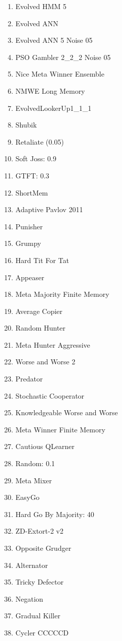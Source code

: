 \begin{multicols}{3}
\begin{enumerate}
  \item Evolved HMM 5
  \item Evolved ANN
  \item Evolved ANN 5 Noise 05
  \item PSO Gambler 2\_2\_2 Noise 05
  \item Nice Meta Winner Ensemble
  \item NMWE Long Memory
  \item EvolvedLookerUp1\_1\_1
  \item Shubik
  \item Retaliate (0.05)
  \item Soft Joss: 0.9
  \item GTFT: 0.3
  \item ShortMem
  \item Adaptive Pavlov 2011
  \item Punisher
  \item Grumpy
  \item Hard Tit For Tat
  \item Appeaser
  \item Meta Majority Finite Memory
  \item Average Copier
  \item Random Hunter
  \item Meta Hunter Aggressive
  \item Worse and Worse 2
  \item Predator
  \item Stochastic Cooperator
  \item Knowledgeable Worse and Worse
  \item Meta Winner Finite Memory
  \item Cautious QLearner
  \item Random: 0.1
  \item Meta Mixer
  \item EasyGo
  \item Hard Go By Majority: 40
  \item ZD-Extort-2 v2
  \item Opposite Grudger
  \item Alternator
  \item Tricky Defector
  \item Negation
  \item Gradual Killer
  \item Cycler CCCCCD
\end{enumerate}
\end{multicols}

